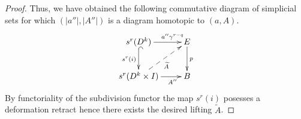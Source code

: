 \documentclass[oneside, 10pt]{amsart}
\theoremstyle{plain}
\numberwithin{equation}{section}
\numberwithin{lemma}{section}
\theoremstyle{remark}
\theoremstyle{definition}
\begin{document}
\begin{proof}
 Thus, we have obtained the following commutative diagram of simplicial sets for which $(|a''|, |A''|)$ is a diagram homotopic to $(a, A)$.
   \begin{equation} \nonumber \xymatrix{ 
    s^{r}(D^k)          \ar[r]^(0.7){a''\gamma^{r-q}}  \ar@{^{(}->}_{s^{r}(i)}[d] & E \ar[d]^{p}  \\
    s^{r}(D^k \times I) \ar[r]_(0.7){A''}  \ar@{-->}[ru]_{\widetilde{A}} & B}
   \end{equation}
 By functoriality of the subdivision functor the map $s^{r}(i)$ posesses a deformation retract hence there exists the desired lifting $\widetilde{A}$.
 \end{proof}
 

\printbibliography
\end{document}
